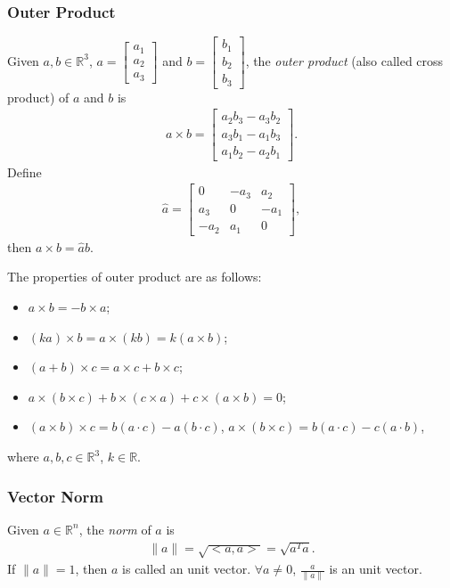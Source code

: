 \subsubsection*{Outer Product}
Given $a,b \in \mathbb{R}^3$,
$ a = \begin{bmatrix}
a_1 \\
a_2  \\
a_3
\end{bmatrix}$ and
$ b = \begin{bmatrix}
b_1 \\
b_2 \\
b_3
\end{bmatrix}$, the \emph{outer product} (also called cross product) of $a$ and $b$ is
\begin{align*}
a \times b = \begin{bmatrix}
a_2 b_3 - a_3 b_2\\
a_3 b_1 - a_1 b_3\\
a_1 b_2 - a_2 b_1
\end{bmatrix}.
\end{align*}
Define
\begin{align*}
\hat a =
\begin{bmatrix}
 0 & -a_3 & a_2 \\
a_3 & 0 & -a_1 \\
 -a_2 & a_1 & 0
 \end{bmatrix},
\end{align*}
then $a \times b = \hat a b$.

The properties of outer product are as follows:
\begin{itemize}
  \item $a \times b = - b \times a$;
  \item $(ka) \times b = a \times (kb) = k (a \times b)$;
  \item $(a+b) \times c = a \times c + b \times c$;
  \item $a \times (b \times c) + b \times (c \times a) + c \times (a \times b) = 0 $;
  \item $(a \times b) \times c = b ( a \cdot c ) - a ( b \cdot c)$, $a \times (b \times c) = b ( a \cdot c) - c (a \cdot b)$,
\end{itemize}
where $a, b, c \in \mathbb{R}^3$, $k \in \mathbb{R}$.

\subsubsection*{Vector Norm}

Given $a\in \mathbb{R}^n$, the \emph{norm} of $a$ is
\begin{align*}
 \| a \| = \sqrt{ <a, a>}  = \sqrt{ a^T a }.
\end{align*}
If $\| a \| = 1$, then $a$ is called an unit vector. $\forall a \neq 0$, $\frac{a}{\| a \|}$ is an unit vector.


